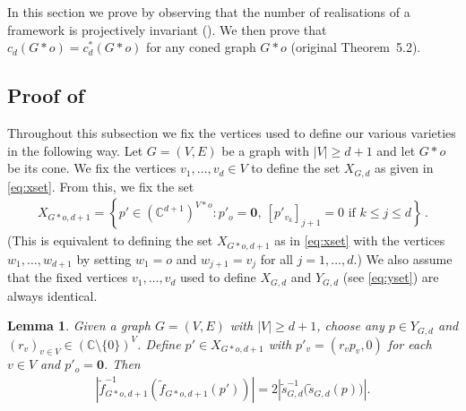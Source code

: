 \documentclass[11pt]{article}
\newtheorem{lemma}[theo]{Lemma}
\theoremstyle{definition}
\numberwithin{equation}{section}
\begin{document}
In this section we prove  by observing that the number of realisations of a framework is projectively invariant ().
We then prove that $c_d(G*o) = c_d^*(G*o)$ for any coned graph $G*o$ (original Theorem~5.2).

\subsection{Proof of \texorpdfstring{}{Theorem 1.2}}

Throughout this subsection we fix the vertices used to define our various varieties in the following way.
Let $G=(V,E)$ be a graph with $|V| \geq d+1$ and let $G*o$ be its cone.
We fix the vertices $v_1,\ldots, v_d \in V$ to define the set $X_{G,d}$ as given in \eqref{eq:xset}.
From this, we fix the set
\begin{align*}
	X_{G*o,d+1} = \left\{ p' \in (\mathbb{C}^{d+1})^{V*o} : p'_o = \mathbf{0}, ~  [p'_{v_k}]_{j+1}=0 \text{ if } k \leq j \leq d  \right\}\,.
\end{align*}
(This is equivalent to defining the set $X_{G*o,d+1}$ as in \eqref{eq:xset} with the vertices $w_1,\ldots,  w_{d+1}$ by setting $w_1 = o$ and $w_{j+1} = v_j$ for all $j =1,\ldots, d$.)
We also assume that the fixed vertices $v_1,\ldots,v_d$ used to define $X_{G,d}$ and $Y_{G,d}$ (see \eqref{eq:yset}) are always identical.



\begin{lemma}\label{kl:proj}
	Given a graph $G=(V,E)$ with $|V| \geq d+1$,
	choose any $p \in Y_{G,d}$ and $(r_v)_{v \in V} \in (\mathbb{C}\setminus \{0\})^{V}$.
	Define $p' \in X_{G*o,d+1}$ with $p'_v = (r_vp_v,0)$ for each $v \in V$ and $p'_o=\mathbf{0}$.
	Then
	\begin{align*}
		\left| \tilde{f}_{G*o,d+1}^{-1}\left(\tilde{f}_{G*o,d+1}(p') \right) \right| = 2 \left| \tilde{s}_{G,d}^{-1}\Big(\tilde{s}_{G,d}(p) \Big) \right|.
	\end{align*} 
\end{lemma}
\end{document}
